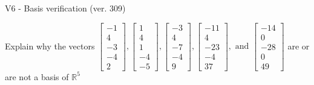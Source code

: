 \begin{exercise}
  \begin{exerciseTitle}V6 - Basis verification (ver. 309)\end{exerciseTitle}
  \begin{exerciseStatement}
    Explain why the vectors \(\left[\begin{array}{r}
-1 \\
4 \\
-3 \\
-4 \\
2
\end{array}\right] , \left[\begin{array}{r}
1 \\
4 \\
1 \\
-4 \\
-5
\end{array}\right] , \left[\begin{array}{r}
-3 \\
4 \\
-7 \\
-4 \\
9
\end{array}\right] , \left[\begin{array}{r}
-11 \\
4 \\
-23 \\
-4 \\
37
\end{array}\right] , \text{ and } \left[\begin{array}{r}
-14 \\
0 \\
-28 \\
0 \\
49
\end{array}\right]\) are or are not a basis of \(\mathbb{R}^5\)	



\end{exerciseStatement}
\end{exercise}
